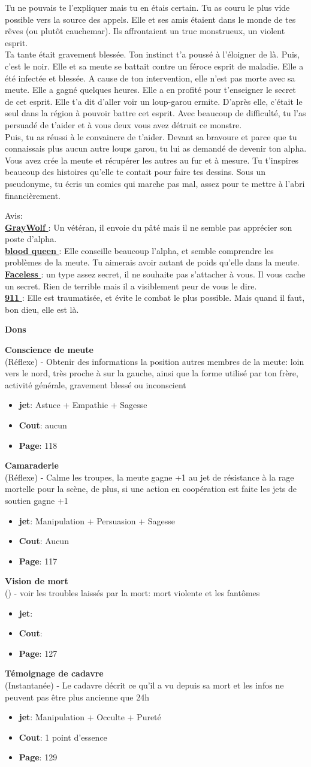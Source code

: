 \documentclass[oneside,12pt]{book}
\newcommand\don[6]{
\textbf{#1} \\
(#6) - #2
\begin{itemize}
\item{ \textbf{jet}: #3}
\item{ \textbf{Cout}: #4}
\item{ \textbf{Page}: #5}
\end{itemize}
\vspace{0.5cm}
}
\newcommand{\Glen}{\textbf{GrayWolf} }
\newcommand{\Laura}{\textbf{blood queen} }
\newcommand{\Andy}{\textbf{Faceless} }
\newcommand{\Kelly}{\textbf{911} }
\begin{document}
\begin{flushleft}
\begin{description}
{Tu ne pouvais te l'expliquer mais tu en étais certain. 
Tu as couru le plus vide possible vers la source des appels. Elle et ses amis étaient dans le monde de tes rêves (ou plutôt cauchemar). 
Ils affrontaient un truc monstrueux, un violent esprit. \\
Ta tante était gravement blessée. Ton instinct t'a poussé à l'éloigner de là. Puis, c'est le noir. Elle et sa meute se battait contre un féroce esprit de maladie. Elle a été infectée et blessée.
A cause de ton intervention, elle n'est pas morte avec sa meute. Elle a gagné quelques heures. Elle a en profité pour t'enseigner le secret de cet esprit. Elle t'a dit d'aller voir un loup-garou ermite. D'après elle, c'était le seul dans la région à pouvoir battre cet esprit. Avec beaucoup de difficulté, tu l'as persuadé de t'aider et à vous deux vous avez détruit ce monstre. \\
Puis, tu as réussi à le convaincre de t'aider. Devant sa bravoure et parce que tu connaissais plus aucun autre loups garou, tu lui as demandé de devenir ton alpha. Vous avez crée la meute et récupérer les autres au fur et à mesure.
Tu t'inspires beaucoup des histoires qu'elle te contait pour faire tes dessins. Sous un pseudonyme, tu écris un comics qui marche pas mal, assez pour te mettre à l’abri financièrement.

Avis:\\
\underline{\Glen} : Un vétéran, il envoie du pâté mais il ne semble pas apprécier son poste d'alpha. \\
\underline{\Laura} : Elle conseille beaucoup l'alpha, et semble comprendre les problèmes de la meute. Tu aimerais avoir autant de poids qu'elle dans la meute.\\
\underline{\Andy}: un type assez secret, il ne souhaite pas s'attacher à vous. Il vous cache un secret. Rien de terrible mais il a visiblement peur de vous le dire.\\
\underline{\Kelly}: Elle est traumatisée, et évite le combat le plus possible. Mais quand il faut, bon dieu, elle est là.\\
}
\end{description}
\clearpage
\textbf{\large Dons}
\vspace{0.5cm}

\don{Conscience de meute}{Obtenir des informations la position autres membres de la meute: loin vers le nord, très proche à sur la gauche, ainsi que la forme utilisé par ton frère, activité générale, gravement blessé ou inconscient}{Astuce + Empathie + Sagesse}{aucun}{118}{Réflexe}
\don{Camaraderie}{Calme les troupes, la meute gagne +1 au jet de résistance à la rage mortelle pour la scène, de plus, si une action en coopération est faite les jets de soutien gagne +1}{Manipulation + Persuasion + Sagesse}{Aucun}{117}{Réflexe}
\don{Vision de mort}{voir les troubles laissés par la mort: mort violente et les fantômes}{}{}{127}{}
\don{Témoignage de cadavre}{Le cadavre décrit ce qu'il a vu depuis sa mort et les infos ne peuvent pas être plus ancienne que 24h}{Manipulation + Occulte + Pureté}{1 point d'essence}{129}{Instantanée}



\end{flushleft}
\end{document}
